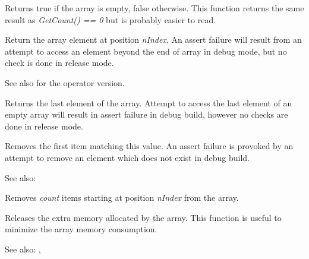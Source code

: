 \label{wxarraystringisempty}


Returns true if the array is empty, false otherwise. This function returns the
same result as {\it GetCount() == 0} but is probably easier to read.

\label{wxarraystringitem}


Return the array element at position {\it nIndex}. An assert failure will
result from an attempt to access an element beyond the end of array in debug
mode, but no check is done in release mode.

See also  for the operator
version.

\label{wxarraystringlast}


Returns the last element of the array. Attempt to access the last element of
an empty array will result in assert failure in debug build, however no checks
are done in release mode.

\label{wxarraystringremove}


Removes the first item matching this value. An assert failure is provoked by
an attempt to remove an element which does not exist in debug build.

See also: 

\label{wxarraystringremoveat}


Removes {\it count} items starting at position {\it nIndex} from the array.

\label{wxarraystringshrink}


Releases the extra memory allocated by the array. This function is useful to
minimize the array memory consumption.

See also: , 

\label{wxarraystringsort}

